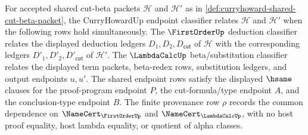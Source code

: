\begin{definition}\label{def:curryhoward-endpoint-classifier}
For accepted shared cut-beta packets $\mathcal H$ and $\mathcal H'$ as in \autoref{def:curryhoward-shared-cut-beta-packet}, the CurryHowardUp endpoint classifier relates $\mathcal H$ and $\mathcal H'$ when the following rows hold simultaneously. The $\FirstOrderUp$ deduction classifier relates the displayed deduction ledgers $D_1,D_2,D_{\mathsf{cut}}$ of $\mathcal H$ with the corresponding ledgers $D'_1,D'_2,D'_{\mathsf{cut}}$ of $\mathcal H'$. The $\LambdaCalcUp$ beta/substitution classifier relates the displayed term packets, beta-redex rows, substitution ledgers, and output endpoints $u,u'$. The shared endpoint rows satisfy the displayed $\hsame$ clauses for the proof-program endpoint $P$, the cut-formula/type endpoint $A$, and the conclusion-type endpoint $B$. The finite provenance row $\rho$ records the common dependence on $\NameCert_{\FirstOrderUp}$ and $\NameCert_{\LambdaCalcUp}$, with no host proof equality, host lambda equality, or quotient of alpha classes.
\end{definition}

